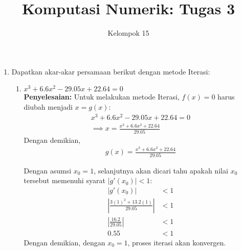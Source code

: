 \documentclass{article}
\title{\textbf{Komputasi Numerik: Tugas 3}}
\author{Kelompok 15}
\date{}
\newcommand{\penyelesaian}{\textbf{Penyelesaian: }}
\begin{document}
\maketitle

\begin{enumerate}
    \item Dapatkan akar-akar persamaan berikut dengan metode Iterasi: 
    \begin{enumerate}
        \item $x^3 + \num{6,6}x^2 - \num{29,05}x + \num{22,64} = 0$ \\
        \penyelesaian Untuk melakukan metode Iterasi, $f(x) = 0$ harus diubah menjadi $x = g(x)$:
        \begin{align*}
            x^3 + \num{6,6}x^2 - \num{29,05}x + \num{22,64} = 0 \\
            \implies x = \frac{x^3 + \num{6,6}x^2 + \num{22,64}}{\num{29,05}}
        \end{align*}
        Dengan demikian, 
        \begin{align*}
            g(x) = \frac{x^3 + \num{6,6}x^2 + \num{22,64}}{\num{29,05}}    
        \end{align*}

        Dengan asumsi $x_0 = 1$, selanjutnya akan dicari tahu apakah nilai $x_0$ tersebut memenuhi syarat $|g'(x_0)| < 1$:
        \begin{align*}
            \left|g'(x_0)\right| &< 1 \\
            \left|\frac{3(1)^2 + \num{13,2}(1)}{\num{29,05}}\right| &< 1 \\
            \left|\frac{\num{16,2}}{\num{29,05}}\right| &< 1 \\
            \num{0,55} &< 1
        \end{align*}
        Dengan demikian, dengan $x_0 = 1$, proses iterasi akan konvergen. \\


\end{enumerate}
\end{enumerate}
\end{document}
